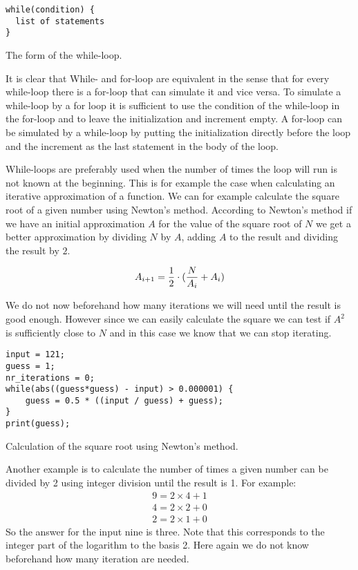 \begin{listing}[H]
\begin{verbatim}
while(condition) {
  list of statements
}
\end{verbatim}
\caption{The form of the while-loop.}
\label{lst:while_loop}
\end{listing}

It is clear that While- and for-loop are equivalent in the sense that for every while-loop there is a for-loop that can simulate it and vice versa. To simulate a while-loop by a for loop it is sufficient to use the condition of the while-loop in the for-loop and to leave the initialization and increment empty. A for-loop can be simulated by a while-loop by putting the initialization directly before the loop and the increment as the last statement in the body of the loop.

While-loops are preferably used when the number of times the loop will run is not known at the beginning. This is for example the case when calculating an iterative approximation of a function. We can for example calculate the square root of a given number using Newton's method. According to Newton's method if we have an initial approximation $A$ for the value of the square root of $N$ we get a better approximation by dividing $N$ by $A$, adding $A$ to the result and dividing the result by $2$. 

\begin{equation}
	A_{i+1} = {{1}\over{2}} \cdot {({{N} \over {A_{i}}} + A_{i})}  
\end{equation}

We do not now beforehand how many iterations we will need until the result is good enough. However since we can easily calculate the square we can test if $A^{2}$ is sufficiently close to $N$ and in this case we know that we can stop iterating. 

\begin{listing}[H]
\begin{verbatim}
input = 121;
guess = 1;
nr_iterations = 0;
while(abs((guess*guess) - input) > 0.000001) {
	guess = 0.5 * ((input / guess) + guess);
}
print(guess);
\end{verbatim}
\caption{Calculation of the square root using Newton's method.}
\label{lst:while_loop_square_root}
\end{listing}

Another example is to calculate the number of times a given number can be divided by 2 using integer division until the result is 1. For example:
\begin{align}
	9 = 2 \times 4  + 1  \\
	4 = 2 \times 2 + 0 \\
	2 = 2 \times 1 + 0
\end{align}
So the answer for the input nine is three. Note that this corresponds to the integer part of the logarithm to the basis 2. Here again we do not know beforehand how many iteration are needed.


